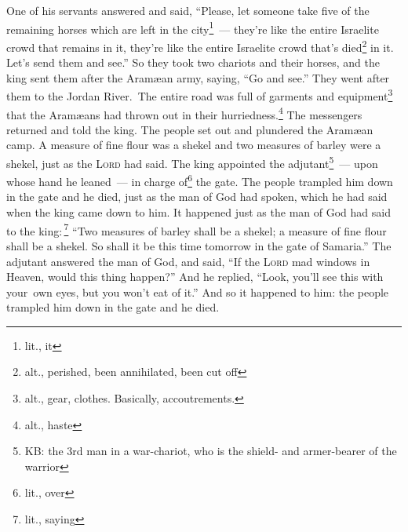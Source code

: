 \begin{inparaenum}
     One of his servants answered and said, ``Please, let someone take five of the remaining horses which are left in the city\understood\footnote{lit., it}~--- they're like the entire Israelite crowd that remains in it, they're like the entire Israelite crowd that's died\footnote{alt., perished, been annihilated, been cut off} in it. Let's send them and see.''%
     So they took two chariots and their horses, and the king sent them after the Aram\ae{}an army, saying, ``Go and see.''%
     They went after them to the Jordan River.\understood\ The entire road was full of garments and equipment\footnote{alt., gear, clothes. Basically, accoutrements.} that the Aram\ae{}ans had thrown out in their hurriedness.\footnote{alt., haste} The messengers returned and told the king.%
     The people set out and plundered the Aram\ae{}an camp. A measure of fine flour was a shekel and two measures of barley were a shekel, just as the \textsc{Lord} had said.%
     The king appointed the adjutant\footnote{KB: the 3rd man in a war-chariot, who is the shield- and armer-bearer of the warrior}~--- upon whose hand he leaned~--- in charge of\footnote{lit., over} the gate. The people trampled him down in the gate and he died, just as the man of God had spoken, which he had said when the king came down to him.%
     It happened just as the man of God had said to the king:\,\footnote{lit., saying} ``Two measures of barley shall be a shekel; a measure of fine flour shall be a shekel. So shall it be this time tomorrow in the gate of Samaria.''%
     The adjutant answered the man of God, and said, ``If the \textsc{Lord} mad windows in Heaven, would this thing happen?'' And he replied, ``Look, you'll see this with your\understood\ own eyes, but you won't eat of it.''%
     And so it happened to him: the people trampled him down in the gate and he died.%
\end{inparaenum}
